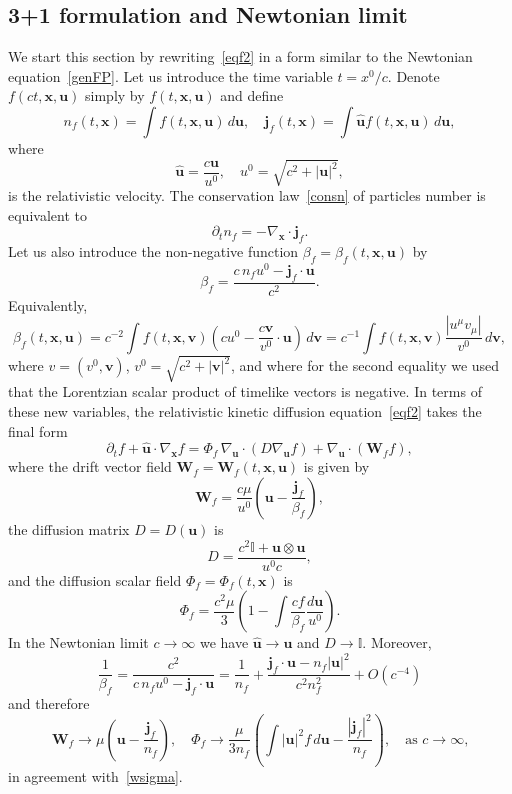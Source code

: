 \documentclass[12pt]{article}
\theoremstyle{definition}
\numberwithin{equation}{section}
\begin{document}
\subsection{3+1 formulation and Newtonian limit}
We start this section by rewriting~\eqref{eqf2} in a form similar to the Newtonian equation~\eqref{genFP}.
Let us introduce the time variable $t=x^0/c$. Denote $f(c t,{\bm x},{\bm u})$ simply by $f(t,{\bm x}, {\bm u})$ and define
\[
n_f(t,{\bm x})=\int f(t,{\bm x},{\bm u}) \, d{\bm u},\quad {\bm j}_f(t,{\bm x})=\int  {\bm {\widehat{u}}}f(t,{\bm x},{\bm u})\,d{\bm u},
\]
where 
\[
{\bm {\widehat{u}}}=\frac{c{\bm u}}{u^0},\quad u^0=\sqrt{c^2+|{\bm u}|^2},
\]
is the relativistic velocity. The conservation law~\eqref{consn} of particles number is equivalent to
\[
\partial_t n_f=-\nabla_{\bm x}\cdot{\bm j}_f.
\]
Let us also introduce the non-negative function $\beta_f=\beta_f(t,{\bm x},{\bm u})$ by
\[
\beta_f=\frac{c\,n_fu^0-{\bm j}_f\cdot{\bm u}}{c^2}.
\]
Equivalently,
\begin{equation}\label{epsilon2}
\beta_f(t,{\bm x},{\bm u})=c^{-2}\int f(t,{\bm x},{\bm v})(cu^0-\frac{c{\bm v}}{v^0}\cdot{\bm u})\,d{\bm v}=c^{-1}\int f(t,{\bm x},{\bm v})\frac{|u^\mu v_\mu|}{v^0}\,d{\bm v},
\end{equation}
where $v=(v^0,{\bm v})$, $v^0=\sqrt{c^2+|{\bm v}|^2}$, and where for the second equality we used that the Lorentzian scalar product of timelike vectors is negative.
In terms of these new variables, the relativistic kinetic diffusion equation~\eqref{eqf2} takes the final form
\begin{equation}\label{FPrel}
\partial_tf+{\bm {\widehat{u}}}\cdot\nabla_{\bm x}f=\Phi_f\,\nabla_{\bm u}\cdot\left(D\nabla_{\bm u}f\right)+\nabla_{{\bm u}}\cdot({\bm W}_ff),
\end{equation}
where the drift vector field ${\bm W}_f={\bm W}_f(t,{\bm x}, {\bm u})$ is given by
\[
{\bm W}_f=
\frac{c\mu}{u^0}\left({\bm u}-\frac{{\bm j}_f}{\beta_f}\right),
\]
the diffusion matrix $D=D({\bm u})$ is 
\[
D=\frac{c^2\mathbb{I}+{\bm u}\otimes {\bm u}}{u^0c},
\]
and the diffusion scalar field $\Phi_f=\Phi_f(t,{\bm x})$ is
\begin{equation}\label{phif}
\Phi_f=\frac{c^2\mu}{3}\left(1-\int \frac{cf}{\beta_f}\frac{d{\bm u}}{u^0}\right).
\end{equation}
In the Newtonian limit $c\to\infty$ we have ${\bm {\widehat{u}}}\to {\bm u}$ and $D\to \mathbb{I}$. Moreover,
\[
\frac{1}{\beta_f}=\frac{c^2}{c\,n_fu^0-{\bm j}_f\cdot{\bm u}}=\frac{1}{n_f}+\frac{{\bm j}_f\cdot{\bm u}-n_f|{\bm u}|^2}{c^2n_f^2}+O(c^{-4})
\]
and therefore
\[
{\bm W}_f\to\mu\left({\bm u}-\frac{{\bm j}_f}{n_f}\right),\quad \Phi_f\to\frac{\mu}{3n_f}\left(\int |{\bm u}|^2f\,d{\bm u}-\frac{|{\bm j}_f|^2}{n_f}\right),\quad \text{as $c\to\infty$,}
\]
in agreement with~\eqref{wsigma}.
\end{document}
